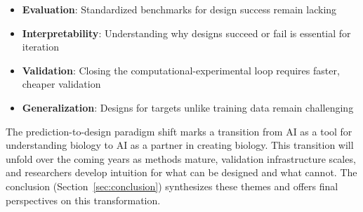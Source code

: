 \begin{itemize}
    \item \textbf{Evaluation}: Standardized benchmarks for design success remain lacking~\cite{bernett2024bias}
    \item \textbf{Interpretability}: Understanding why designs succeed or fail is essential for iteration~\cite{ruffolo2022deepab}
    \item \textbf{Validation}: Closing the computational-experimental loop requires faster, cheaper validation~\cite{trepte2024ai}
    \item \textbf{Generalization}: Designs for targets unlike training data remain challenging~\cite{kewalramani2023state}
\end{itemize}

\vspace{1em}
\noindent
The prediction-to-design paradigm shift marks a transition from AI as a tool for understanding biology to AI as a partner in creating biology. This transition will unfold over the coming years as methods mature, validation infrastructure scales, and researchers develop intuition for what can be designed and what cannot. The conclusion (Section~\ref{sec:conclusion}) synthesizes these themes and offers final perspectives on this transformation.
